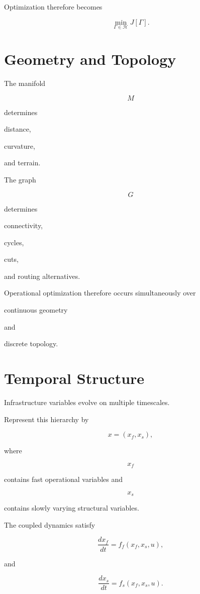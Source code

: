 \documentclass[11pt,fleqn]{book}
\numberwithin{equation}{chapter}
\theoremstyle{plain}
\theoremstyle{definition}
\theoremstyle{remark}
\begin{document}
Optimization therefore becomes

\[
\boxed{
\min_{\Gamma\in\mathcal H}
J[\Gamma].
}
\]


\section{Geometry and Topology}

The manifold

\[
M
\]

determines

distance,

curvature,

and terrain.

The graph

\[
G
\]

determines

connectivity,

cycles,

cuts,

and routing alternatives.

Operational optimization therefore occurs simultaneously over

continuous geometry

and

discrete topology.


\section{Temporal Structure}

Infrastructure variables evolve on multiple timescales.

Represent this hierarchy by

\[
x
=
(x_f,x_s),
\]

where

\[
x_f
\]

contains fast operational variables and

\[
x_s
\]

contains slowly varying structural variables.

The coupled dynamics satisfy

\[
\frac{dx_f}{dt}
=
f_f(x_f,x_s,u),
\]

and

\[
\frac{dx_s}{dt}
=
f_s(x_f,x_s,u).
\]
\end{document}
